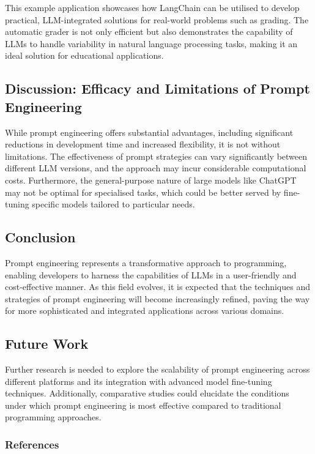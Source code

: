 \documentclass[
]{agujournal2019}
\begin{document}
This example application showcases how LangChain can be utilised to
develop practical, LLM-integrated solutions for real-world problems such
as grading. The automatic grader is not only efficient but also
demonstrates the capability of LLMs to handle variability in natural
language processing tasks, making it an ideal solution for educational
applications.

\subsection{Discussion: Efficacy and Limitations of Prompt
Engineering}\label{discussion-efficacy-and-limitations-of-prompt-engineering}

While prompt engineering offers substantial advantages, including
significant reductions in development time and increased flexibility, it
is not without limitations. The effectiveness of prompt strategies can
vary significantly between different LLM versions, and the approach may
incur considerable computational costs. Furthermore, the general-purpose
nature of large models like ChatGPT may not be optimal for specialised
tasks, which could be better served by fine-tuning specific models
tailored to particular needs.

\subsection{Conclusion}\label{conclusion}

Prompt engineering represents a transformative approach to programming,
enabling developers to harness the capabilities of LLMs in a
user-friendly and cost-effective manner. As this field evolves, it is
expected that the techniques and strategies of prompt engineering will
become increasingly refined, paving the way for more sophisticated and
integrated applications across various domains.

\subsection{Future Work}\label{future-work}

Further research is needed to explore the scalability of prompt
engineering across different platforms and its integration with advanced
model fine-tuning techniques. Additionally, comparative studies could
elucidate the conditions under which prompt engineering is most
effective compared to traditional programming approaches.

\subsubsection{References}\label{references}
\end{document}
